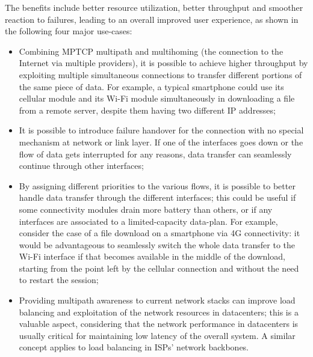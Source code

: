 The benefits include better resource utilization, better throughput and smoother reaction to failures, leading to an overall improved user experience, as shown in the following four major use-cases:
\begin{itemize}
  \item Combining MPTCP multipath and multihoming (the connection to the Internet via multiple providers), it is possible to achieve higher throughput by exploiting multiple simultaneous connections to transfer different portions of the same piece of data. For example, a typical smartphone could use its cellular module and its Wi-Fi module simultaneously in downloading a file from a remote server, despite them having two different IP addresses;
  \item It is possible to introduce failure handover for the connection with no special mechanism at network or link layer. If one of the interfaces goes down or the flow of data gets interrupted for any reasons, data transfer can seamlessly continue through other interfaces;
  \item By assigning different priorities to the various flows, it is possible to better handle data transfer through the different interfaces; this could be useful if some connectivity modules drain more battery than others, or if any interfaces are associated to a limited-capacity data-plan. For example, consider the case of a file download on a smartphone via 4G connectivity: it would be advantageous to seamlessly switch the whole data transfer to the Wi-Fi interface if that becomes available in the middle of the download, starting from the point left by the cellular connection and without the need to restart the session;
  \item Providing multipath awareness to current network stacks can improve load balancing and exploitation of the network resources in datacenters; this is a valuable aspect, considering that the network performance in datacenters is usually critical for maintaining low latency of the overall system. A similar concept applies to load balancing in ISPs' network backbones.
\end{itemize}

